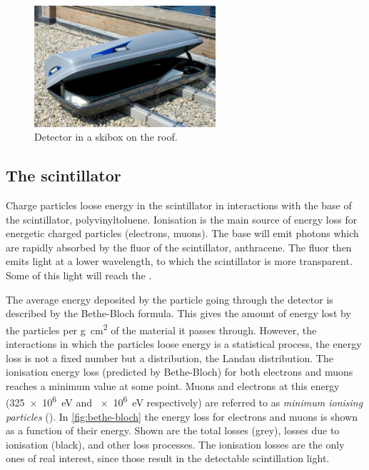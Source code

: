 \begin{figure}
    \centering
    \includegraphics[width=0.6\textwidth]
                    {plots/station/ADL_105036.jpg}
    \caption{Detector in a skibox on the roof.}
    \label{fig:detector_in_skibox}
\end{figure}

\subsection{The scintillator}

Charge particles loose energy in the scintillator in interactions with the base of the scintillator, polyvinyltoluene. Ionisation is the main source of energy loss for energetic charged particles (electrons, muons). The base will emit photons which are rapidly absorbed by the fluor of the scintillator, anthracene. The fluor then emits light at a lower wavelength, to which the scintillator is more transparent. Some of this light will reach the \pmt.

The average energy deposited by the particle going through the detector is described by the Bethe-Bloch formula. This gives the amount of energy lost by the particles per \si{\gram\centi\meter\squared} of the material it passes through. However, the interactions in which the particles loose energy is a statistical process, the energy loss is not a fixed number but a distribution, the Landau distribution. The ionisation energy loss (predicted by Bethe-Bloch) for both electrons and muons reaches a minimum value at some point. Muons and electrons at this energy (\SI{325e6}{\eV} and \SI{e6}{\eV} respectively) are referred to as \textit{minimum ionising particles} (\mip). In \cref{fig:bethe-bloch} the energy loss for electrons and muons is shown as a function of their energy. Shown are the total losses (grey), losses due to ionisation (black), and other loss processes. The ionisation losses are the only ones of real interest, since those result in the detectable scintillation light.

